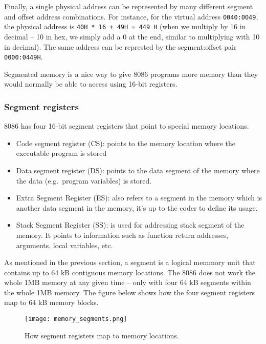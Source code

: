\documentclass[a4paper]{article}
\begin{document}
Finally, a single physical address can be represented by many different segment and offset address combinations. For instance, for the virtual address \texttt{0040:0049}, the physical address is \texttt{40H * 16 + 49H = 449 H} (when we multiply by 16 in decimal -- 10 in hex, we simply add a 0 at the end, similar to multiplying with 10 in decimal). The same address can be represted by the segment:offset pair \texttt{0000:0449H}.

Segmented memory is a nice way to give 8086 programs more memory than they would normally be able to access using 16-bit registers.
%

\subsubsection{Segment registers}

8086 has four 16-bit segment registers that point to special memory locations.

\begin{itemize}
	\item Code segment register (CS): points to the memory location where the executable program is stored
	\item Data segment register (DS): points to the data segment of the memory where the data (e.g.\ program variables) is stored.
	\item Extra Segment Register (ES): also refers to a segment in the memory which is another data segment in the memory, it's up to the coder to define its usage.
	\item Stack Segment Register (SS): is used for addressing stack segment of the memory. It points to information such as function return addresses, arguments, local variables, etc. 
\end{itemize}

As mentioned in the previous section, a segment is a logical memmory unit that contains up to 64 kB contiguous memory locations. The 8086 does not work the whole 1MB memory at any given time -- only with four 64 kB segments within the whole 1MB memory. The figure below shows how the four segment registers map to 64 kB memory blocks. 

\begin{figure}[H]
	\centering
	\texttt{[image: memory\_segments.png]}
	\caption{How segment registers map to memory locations.}
\end{figure}
\end{document}
